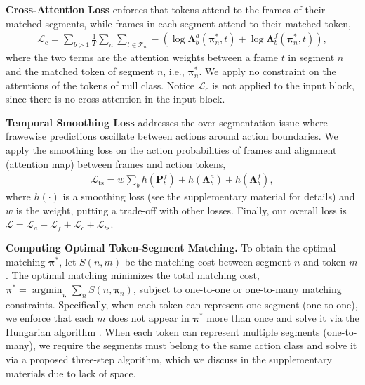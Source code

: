 \documentclass[10pt,twocolumn,letterpaper]{article}
\newcommand{\headline}[1]{\noindent \textbf{#1}}
\newcommand{\Prob}{\mathbf{P}}
\newcommand{\mL}{\mathcal{L}}
\newcommand{\LM}{\mathbf{\Lambda}}
\newcommand{\mT}{\mathcal{T}}
\newcommand{\0}{\boldsymbol{0}}
\newcommand{\amin}{\operatorname{argmin}}
\newcommand{\bpi}{\boldsymbol{\pi}}
\begin{document}
\headline{Cross-Attention Loss} enforces that tokens attend to the frames of their matched segments, while frames in each segment attend to their matched token,
\begin{align}
   \mL_\text{c} = \sum_{b > 1} \frac{1}{T} \sum_{n} \sum_{t \in \mT_n} - \left( \log \LM^a_b(\bpi^{*}_n, t) + \log \LM^f_b(\bpi^{*}_n, t) \right),
\end{align}
where the two terms are the attention weights between a frame $t$ in segment $n$ and the matched token of segment $n$, i.e., $\bpi^*_n$.
We apply no constraint on the attentions of the tokens of null class.
Notice $\mL_\text{c}$ is not applied to the input block, since there is no cross-attention in the input block. 


 
\headline{Temporal Smoothing Loss} addresses the over-segmentation issue where frawewise predictions oscillate between actions around action boundaries. We apply the smoothing loss on the action probabilities of frames and alignment (attention map) between frames and action tokens,
\begin{align}
    \mL_\text{ts} = w \sum_{b} h(\Prob^f_b) + h(\LM^a_b) + h(\LM^f_b),
\end{align}
where $h(\cdot)$ is a smoothing loss \cite{Farha:CVPR19} (see the supplementary material for details) and $w$ is the weight, putting a trade-off with other losses.
Finally, our overall loss is $\mL = \mL_{a} + \mL_{f} + \mL_{c} + \mL_{ts}$. 

\headline{Computing Optimal Token-Segment Matching.} To obtain the optimal matching $\bpi^*$, let $S(n, m)$ be the matching cost between segment $n$ and token $m$. The optimal matching minimizes the total matching cost, $\bpi^{*} = \amin_{\bpi} \sum_{n} S(n, \bpi_n)$, subject to one-to-one or one-to-many matching constraints. 
Specifically, when each token can represent one segment (one-to-one), we enforce that each $m$ does not appear in $\bpi^{*}$ more than once and solve it via the Hungarian algorithm \cite{Kuhn:Hungarian}. When each token can represent multiple segments (one-to-many), we require the segments must belong to the same action class and solve it via a proposed three-step algorithm, which we discuss in the supplementary materials due to lack of space. 
\end{document}
